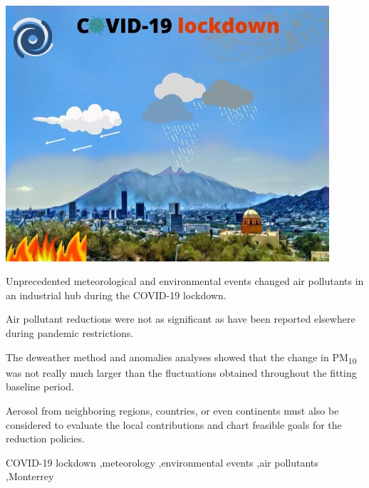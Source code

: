 \documentclass[preprint,12pt]{elsarticle}
\begin{document}
\begin{frontmatter}
\begin{abstract}
\end{abstract}
\begin{graphicalabstract}
    \includegraphics[width=12cm]{COVID-19_lockdown.jpg}
\end{graphicalabstract}
\begin{highlights}
    \item Unprecedented meteorological and environmental events changed air pollutants in an industrial hub during the COVID-19 lockdown.
    \item Air pollutant reductions were not as significant as have been reported elsewhere during pandemic restrictions. 
    \item The deweather method and anomalies analyses showed that the change in PM\textsubscript{10} was not really much larger than the fluctuations obtained throughout the fitting baseline period.
    \item Aerosol from neighboring regions, countries, or even continents must also be considered to evaluate the local contributions and chart feasible goals for the reduction policies.
    \end{highlights}
    \begin{keyword}
        COVID-19 lockdown \sep meteorology  \sep environmental events \sep air pollutants \sep Monterrey
    \end{keyword}
\end{frontmatter}
\end{document}

